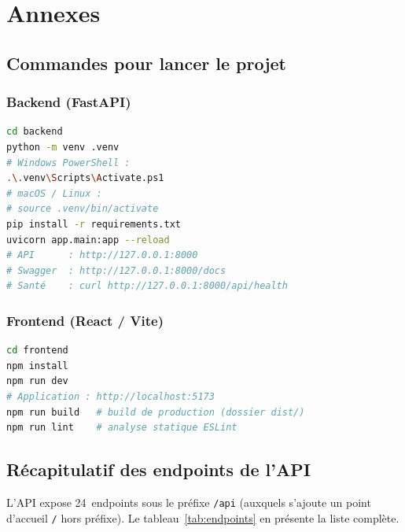\chapter{Annexes}

\section{Commandes pour lancer le projet}

\subsection*{Backend (FastAPI)}
\begin{lstlisting}[language=bash]
cd backend
python -m venv .venv
# Windows PowerShell :
.\.venv\Scripts\Activate.ps1
# macOS / Linux :
# source .venv/bin/activate
pip install -r requirements.txt
uvicorn app.main:app --reload
# API      : http://127.0.0.1:8000
# Swagger  : http://127.0.0.1:8000/docs
# Santé    : curl http://127.0.0.1:8000/api/health
\end{lstlisting}

\subsection*{Frontend (React / Vite)}
\begin{lstlisting}[language=bash]
cd frontend
npm install
npm run dev
# Application : http://localhost:5173
npm run build   # build de production (dossier dist/)
npm run lint    # analyse statique ESLint
\end{lstlisting}

\section{Récapitulatif des endpoints de l'API}

L'API expose 24~endpoints sous le préfixe \texttt{/api} (auxquels s'ajoute un
point d'accueil \texttt{/} hors préfixe). Le tableau~\ref{tab:endpoints} en
présente la liste complète.

